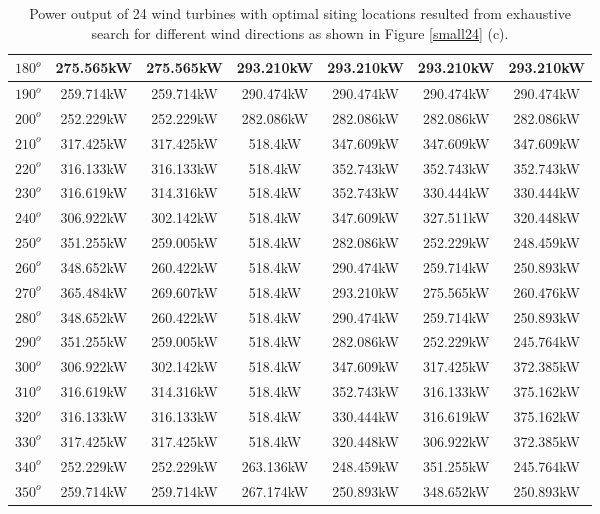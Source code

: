 \begin{table}[H]
\begin{tabular}{|c|c|c|c|c|c|c|}
		$180^o$	& 275.565kW	& 275.565kW	& 293.210kW	& 293.210kW	& 293.210kW	& 293.210kW	\\ \hline
		$190^o$	& 259.714kW	& 259.714kW	& 290.474kW	& 290.474kW	& 290.474kW	& 290.474kW	\\ \hline
		$200^o$	& 252.229kW	& 252.229kW	& 282.086kW	& 282.086kW	& 282.086kW	& 282.086kW	\\ \hline
		$210^o$	& 317.425kW	& 317.425kW	& 518.4kW	& 347.609kW	& 347.609kW	& 347.609kW	\\ \hline
		$220^o$	& 316.133kW	& 316.133kW	& 518.4kW	& 352.743kW	& 352.743kW	& 352.743kW	\\ \hline
		$230^o$	& 316.619kW	& 314.316kW	& 518.4kW	& 352.743kW	& 330.444kW	& 330.444kW	\\ \hline
		$240^o$	& 306.922kW	& 302.142kW	& 518.4kW	& 347.609kW	& 327.511kW	& 320.448kW	\\ \hline
		$250^o$	& 351.255kW	& 259.005kW	& 518.4kW	& 282.086kW	& 252.229kW	& 248.459kW	\\ \hline
		$260^o$	& 348.652kW	& 260.422kW	& 518.4kW	& 290.474kW	& 259.714kW	& 250.893kW	\\ \hline
		$270^o$	& 365.484kW	& 269.607kW	& 518.4kW	& 293.210kW	& 275.565kW	& 260.476kW	\\ \hline
		$280^o$	& 348.652kW	& 260.422kW	& 518.4kW	& 290.474kW	& 259.714kW	& 250.893kW	\\ \hline
		$290^o$	& 351.255kW	& 259.005kW	& 518.4kW	& 282.086kW	& 252.229kW	& 245.764kW	\\ \hline
		$300^o$	& 306.922kW	& 302.142kW	& 518.4kW	& 347.609kW	& 317.425kW	& 372.385kW	\\ \hline
		$310^o$	& 316.619kW	& 314.316kW	& 518.4kW	& 352.743kW	& 316.133kW	& 375.162kW	\\ \hline
		$320^o$	& 316.133kW	& 316.133kW	& 518.4kW	& 330.444kW	& 316.619kW	& 375.162kW	\\ \hline
		$330^o$	& 317.425kW	& 317.425kW	& 518.4kW	& 320.448kW	& 306.922kW	& 372.385kW	\\ \hline
		$340^o$	& 252.229kW	& 252.229kW	& 263.136kW	& 248.459kW	& 351.255kW	& 245.764kW	\\ \hline
		$350^o$	& 259.714kW	& 259.714kW	& 267.174kW	& 250.893kW	& 348.652kW	& 250.893kW	\\ \hline
        	\end{tabular}
        	\caption{Power output of 24 wind turbines with optimal siting locations resulted from exhaustive search for different wind directions as shown in Figure \ref{small24} (c).}
        	\label{table24c}
        \end{table}
